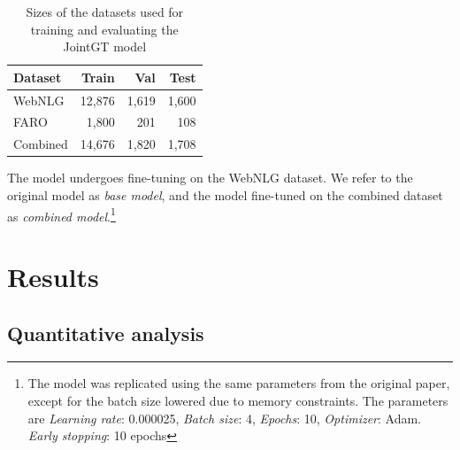 \documentclass[
hf, %
]{ceurart}
\begin{document}
\begin{table}[h]
\caption{Sizes of the datasets used for training and evaluating the JointGT model}
\centering
\begin{tabular}{|l|r|r|r|}
\hline
\textbf{Dataset} & \textbf{Train} & \textbf{Val} & \textbf{Test} \\ \hline
WebNLG           & 12,876          & 1,619         & 1,600          \\ \hline
FARO             & 1,800           & 201          & 108            \\ \hline
Combined         & 14,676          & 1,820         & 1,708          \\ \hline
\end{tabular}

\label{tab:splits_dataset_jointgt}
\end{table}

The model undergoes fine-tuning on the WebNLG dataset. We refer to the original model as \textit{base model}, and the model fine-tuned on the combined dataset as \textit{combined model}.\footnote{The model was replicated using the same parameters from the original paper, except for the batch size lowered due to memory constraints. The parameters are \textit{Learning rate}: 0.000025, \textit{Batch size}: 4, \textit{Epochs}: 10, \textit{Optimizer}: Adam. \textit{Early stopping}: 10 epochs}

\section{Results}
\label{sec:results_jointGT}

\subsection{Quantitative analysis}

\end{document}
